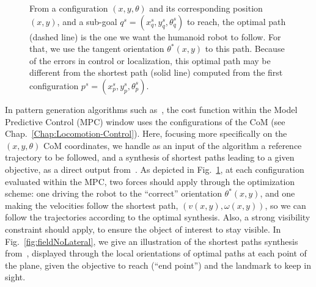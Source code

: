 \begin{figure}[h]
\centering
 \hspace{2cm}
\caption{From a configuration $(x,y,\theta)$ and its corresponding position $(x,y)$, and a sub-goal $q^s= (x_q^s,y_q^s,\theta_q^s)$ to reach, the optimal path (dashed line) is the one we want the humanoid robot to follow. For that, we use the tangent orientation $\theta^*(x,y)$ to this path. Because of the errors in control or localization, this optimal path may be different from the shortest path (solid line) computed from the first configuration $p^s= (x_p^s,y_p^s,\theta_p^s)$.
\label{fig:paths}}
\end{figure}

In pattern generation algorithms such as~\citep{HerdtAR2010}, the cost function within the Model Predictive Control (MPC) window uses the configurations of the CoM (see Chap.~\ref{Chap:Locomotion-Control}). Here, focusing more specifically on the $(x,y,\theta)$ CoM coordinates, we handle as an input of the algorithm a reference trajectory to be followed, and a synthesis of shortest paths leading to a given objective, as a direct output from~\citep{Salaris:2010}. As depicted in Fig.~\ref{fig:paths}, at each configuration evaluated within the MPC, two forces should apply through the optimization scheme: one driving the robot to the ``correct'' orientation $\theta^*(x,y)$, and one making the velocities follow the shortest path, $(v(x,y),\omega(x,y))$, so we can follow the trajectories according to the optimal synthesis. Also, a strong visibility constraint should apply, to ensure the object of interest to stay visible. In Fig.~\ref{fig:fieldNoLateral}, we give an illustration of the shortest paths synthesis from~\citep{Salaris:2010}, displayed through the local orientations of optimal paths at each point of the plane, given the objective to reach (``end point'') and the landmark to keep in sight. 




